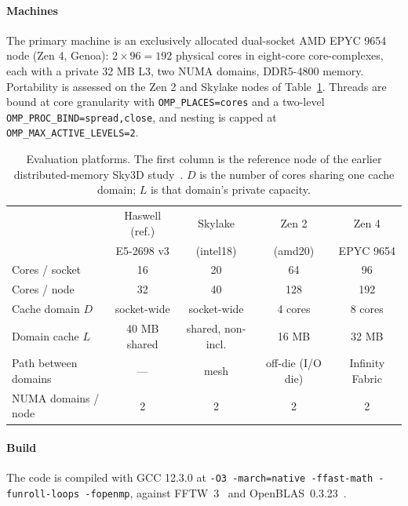 \documentclass[preprint,12pt]{elsarticle}
\numberwithin{equation}{section}
\begin{document}
\paragraph{Machines}
The primary machine is an exclusively allocated dual-socket AMD EPYC 9654 node (Zen 4, Genoa): $2\times96=192$ physical cores in eight-core core-complexes, each with a private 32 MB L3, two NUMA domains, DDR5-4800 memory. Portability is assessed on the Zen 2 and Skylake nodes of Table~\ref{tab:machines}. Threads are bound at core granularity with \texttt{OMP\_PLACES=cores} and a two-level \texttt{OMP\_PROC\_BIND=spread,close}, and nesting is capped at \texttt{OMP\_MAX\_ACTIVE\_LEVELS=2}.

\begin{table}[tbp]\centering
\caption{Evaluation platforms. The first column is the reference node of the earlier distributed-memory Sky3D study~\cite{sky3dmpi,intel_haswell}. $D$ is the number of cores sharing one cache domain; $L$ is that domain's private capacity.}
\label{tab:machines}
\begin{tabular}{lcccc}\toprule
 & Haswell (ref.) & Skylake & Zen 2 & Zen 4\\
 & E5-2698 v3 & (intel18) & (amd20) & EPYC 9654\\\midrule
Cores / socket & 16 & 20 & 64 & 96\\
Cores / node & 32 & 40 & 128 & 192\\
Cache domain $D$ & socket-wide & socket-wide & 4 cores & 8 cores\\
Domain cache $L$ & 40 MB shared & shared, non-incl. & 16 MB & 32 MB\\
Path between domains & --- & mesh & off-die (I/O die) & Infinity Fabric\\
NUMA domains / node & 2 & 2 & 2 & 2\\\bottomrule
\end{tabular}
\end{table}

\paragraph{Build}
The code is compiled with GCC 12.3.0 at \texttt{-O3 -march=native -ffast-math -funroll-loops -fopenmp}, against FFTW~3~\cite{fftw} and OpenBLAS~0.3.23~\cite{openblas}.
\end{document}
